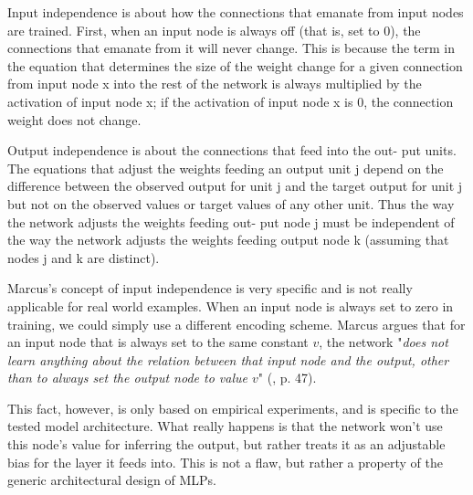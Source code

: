 \documentclass[../../main.tex]{subfiles}
\begin{document}
\begin{citecallout}
    \begin{definition}
        Input independence is about how the connections that emanate from input nodes are trained. First, when an input node is always off (that is, set
        to 0), the connections that emanate from it will never change. This is
        because the term in the equation that determines the size of the weight
        change for a given connection from input node x into the rest of the network is always multiplied by the activation of input node x; if the activation of input node x is 0, the connection weight does not change.
    \end{definition}
\end{citecallout}

\begin{citecallout}
    \begin{definition}
        Output independence is about the connections that feed into the out-
        put units. The equations that adjust the weights feeding an output unit
        j depend on the difference between the observed output for unit j and
        the target output for unit j but not on the observed values or target values of
        any other unit. Thus the way the network adjusts the weights feeding out-
        put node j must be independent of the way the network adjusts the
        weights feeding output node k (assuming that nodes j and k are distinct).
    \end{definition}
\end{citecallout}

\begin{critique}
    Marcus's concept of input independence is very specific and is not really applicable for real world examples. When an input node is always set to zero in training, we could simply use a different encoding scheme. Marcus argues that for an input node that is always set to the same constant $v$, the network "\emph{does not learn anything about the relation between that
    input node and the output, other than to always set the output node to value $v$}" (\textcite{marcus_algebraic_mind}, p. 47).

    This fact, however, is only based on empirical experiments, and is specific to the tested model architecture. What really happens is that the network won't use this node's value for inferring the output, but rather treats it as an adjustable bias for the layer it feeds into. This is not a flaw, but rather a property of the generic architectural design of MLPs.
\end{critique}
\end{document}
